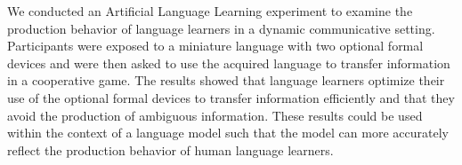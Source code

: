 We conducted an Artificial Language Learning experiment to examine the production behavior of language learners in a dynamic communicative setting. Participants were exposed to a miniature language with two optional formal devices and were then asked to use the acquired language to transfer information in a cooperative game. The results showed that language learners optimize their use of the optional formal devices to transfer information efficiently and that they avoid the production of ambiguous information. These results could be used within the context of a language model such that the model can more accurately reflect the production behavior of human language learners.
